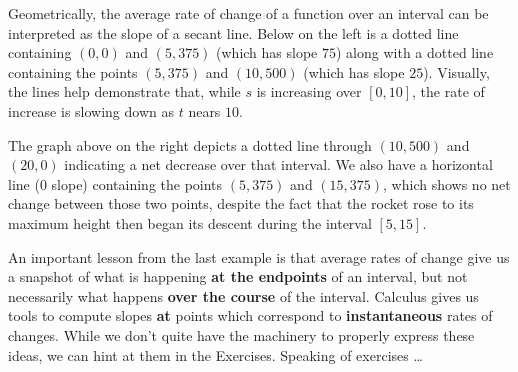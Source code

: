 \documentclass{ximera}
\begin{document}
\begin{example}
\begin{explanation}
\begin{enumerate}
Geometrically, the average rate of change of a function over an interval can be interpreted as the slope of a secant line. Below on the left is a dotted line containing $(0, 0)$ and $(5, 375)$ (which has slope $75$) along with a dotted line containing the points $(5, 375)$ and $(10, 500)$ (which has slope $25$).  Visually, the lines help demonstrate that, while $s$ is increasing over $[0, 10]$, the rate of increase is slowing down as $t$ nears $10$.  

\begin{center}
\end{center}





The graph above on the right depicts a dotted line through $(10, 500)$ and $(20,0)$ indicating a net decrease over that interval.  We also have a horizontal line ($0$ slope) containing the points $(5, 375)$ and $(15, 375)$, which shows no net change between those two points, despite the fact that the rocket rose to its maximum height then began its descent during the interval $[5, 15]$.   




\end{enumerate}

\end{explanation}

\end{example}

An important lesson from the last example is that average rates of change give us a snapshot of what is happening \textbf{at the endpoints} of an interval, but not necessarily what happens \textbf{over the course} of the interval.  Calculus gives us tools to compute slopes \textbf{at} points which correspond to  \textbf{instantaneous} rates of changes.  While we don't quite have the machinery to properly express these ideas, we can hint at them in the Exercises. Speaking of exercises \ldots 
\end{document}
